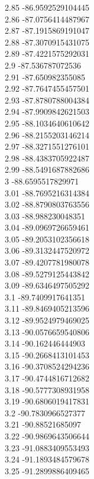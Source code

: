 {2.85	-86.9592529104445\\
2.86	-87.0756414487967\\
2.87	-87.1915869191047\\
2.88	-87.3070915431075\\
2.89	-87.4221575292031\\
2.9	-87.536787072536\\
2.91	-87.650982355085\\
2.92	-87.7647455457501\\
2.93	-87.8780788004384\\
2.94	-87.9909842621503\\
2.95	-88.1034640610642\\
2.96	-88.2155203146214\\
2.97	-88.3271551276101\\
2.98	-88.4383705922487\\
2.99	-88.5491687882686\\
3	-88.6595517829971\\
3.01	-88.7695216314384\\
3.02	-88.8790803763556\\
3.03	-88.988230048351\\
3.04	-89.0969726659461\\
3.05	-89.2053102356618\\
3.06	-89.3132447520972\\
3.07	-89.4207781980078\\
3.08	-89.5279125443842\\
3.09	-89.6346497505292\\
3.1	-89.7409917641351\\
3.11	-89.8469405213596\\
3.12	-89.9524979469025\\
3.13	-90.0576659540806\\
3.14	-90.162446444903\\
3.15	-90.2668413101453\\
3.16	-90.3708524294236\\
3.17	-90.4744816712682\\
3.18	-90.5777308931958\\
3.19	-90.6806019417831\\
3.2	-90.7830966527377\\
3.21	-90.88521685097\\
3.22	-90.9869643506644\\
3.23	-91.0883409553493\\
3.24	-91.1893484579678\\
3.25	-91.2899886409465\\
}
